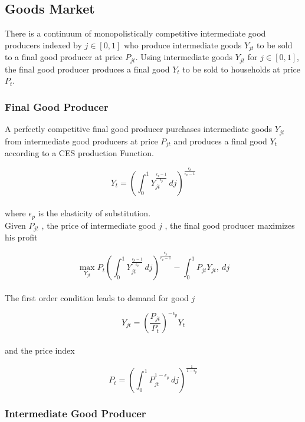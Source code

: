 \documentclass[titlepage]{\econtex}\providecommand{\texname}{BufferStockTheory}
\begin{document}
\hypertarget{Goods Market}{}
\subsection{Goods Market}

There is a continuum of  monopolistically competitive intermediate good producers indexed by $j \in [0,1]$ who produce intermediate goods $Y_{jt}$ to be sold to a final good producer at price $P_{jt}$. Using intermediate goods $Y_{jt}$ for $j \in [0,1]$, the  final good producer produces a final good $Y_{t}$ to be sold to households at price $P_{t}$.  \\ 


\hypertarget{Final Good Producer}{}
\subsubsection{Final Good Producer}

A perfectly competitive final good producer purchases intermediate goods $Y_{jt}$ from intermediate good producers at price $P_{jt}$ and produces a final good $Y_{t}$ according to a CES production Function. 

$$ Y_{t} = \left(\int_{0}^{1} Y_{jt}^{\frac{\epsilon_{p}-1}{\epsilon_{p}}}\, dj\right)^{\frac{\epsilon_{p}}{\epsilon_{p}-1}}$$ \\

where $\epsilon_{p}$ is the elasticity of substitution. \\ 

Given $P_{jt}$ , the price of intermediate good $j$ ,  the final good producer maximizes his profit

$$ \max_{Y_{jt}} P_{t} \left(\int_{0}^{1} Y_{jt}^{\frac{\epsilon_{p}-1}{\epsilon_{p}}}\, dj\right)^{\frac{\epsilon_{p}}{\epsilon_{p}-1}} - \int_{0}^{1} P_{jt} Y_{jt} ,\ dj $$ \\


The first order condition leads to demand for good $j$

$$ Y_{jt} = \left(\frac {P_{jt}}{P_{t}}\right)^{- \epsilon_{p}} Y_{t}$$ \\

and the price index

$$P_{t} = \left(\int_{0}^{1} P_{jt}^{1-\epsilon_{p}}\,dj \right )^{\frac{1}{1-\epsilon_{p}}}$$


\hypertarget{Intermediate Good Producer}{}
\subsubsection{Intermediate Good Producer}
\end{document}
